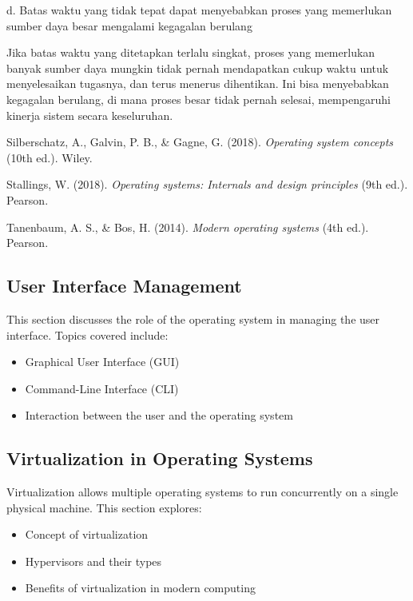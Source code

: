 \documentclass[12pt]{article}
\begin{document}
    d. Batas waktu yang tidak tepat dapat menyebabkan proses yang memerlukan sumber daya besar mengalami kegagalan berulang
    
    Jika batas waktu yang ditetapkan terlalu singkat, proses yang memerlukan banyak sumber daya mungkin tidak pernah mendapatkan cukup waktu untuk menyelesaikan tugasnya, dan terus menerus dihentikan. Ini bisa menyebabkan kegagalan berulang, di mana proses besar tidak pernah selesai, mempengaruhi kinerja sistem secara keseluruhan.\\

    \begin{thebibliography}{9}

        Silberschatz, A., Galvin, P. B., \& Gagne, G. (2018). \textit{Operating system concepts} (10th ed.). Wiley.
        
        Stallings, W. (2018). \textit{Operating systems: Internals and design principles} (9th ed.). Pearson.
        
        Tanenbaum, A. S., \& Bos, H. (2014). \textit{Modern operating systems} (4th ed.). Pearson.
        
    \end{thebibliography}

\subsection{User Interface Management}
This section discusses the role of the operating system in managing the user interface. Topics covered include:
\begin{itemize}
    \item Graphical User Interface (GUI)
    \item Command-Line Interface (CLI)
    \item Interaction between the user and the operating system
\end{itemize}

\subsection{Virtualization in Operating Systems}

Virtualization allows multiple operating systems to run concurrently on a single physical machine. This section explores:
\begin{itemize}
    \item Concept of virtualization
    \item Hypervisors and their types
    \item Benefits of virtualization in modern computing
\end{itemize}
\end{document}
